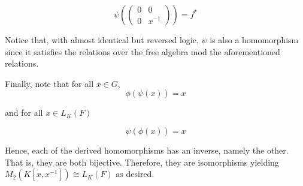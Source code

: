 \begin{solution}
    $$\psi(\left(\begin{array}{cc} 0 & 0 \\ 0 & x^{-1} \end{array}\right))=f^*$$

    Notice that, with almost identical but reversed logic, $\psi$ is also a homomorphism since it
    satisfies the relations over the free algebra mod the aforementioned relations.

    Finally, note that for all $x\in G$, 
    $$\phi(\psi(x))=x$$

    and for all $x\in L_K(F)$

    $$\psi(\phi(x))=x$$

    Hence, each of the derived homomorphisms has an inverse, namely the other. That is, they are
    both bijective. Therefore, they are isomorphisms yielding $M_2(K[x,x^{-1}])\cong L_K(F)$ as desired.
\end{solution}